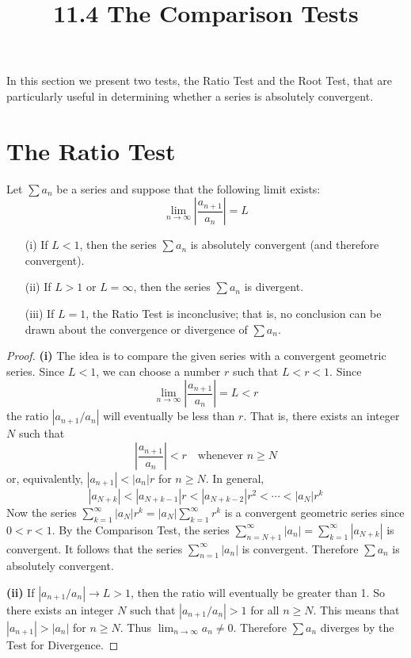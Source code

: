 \documentclass{article}
\title{11.4 The Comparison Tests}
\date{}
\author{}
\theoremstyle{mystyle}
\begin{document}
\maketitle

In this section we present two tests, the Ratio Test and the Root Test, that are particularly useful in determining whether a series is absolutely convergent.

\section*{The Ratio Test}

\begin{tcolorbox}[
    colback=white,
    colframe=orange!80!white,
    title=The Ratio Test,
    boxrule=0.5mm,
    arc=3mm
    ]
    Let \( \sum a_n \) be a series and suppose that the following limit exists:
    \[ \lim_{n\to\infty} \left| \dfrac{a_{n+1}}{a_n} \right| = L \]
    \begin{itemize}
        \item[(i)] If \(L < 1\), then the series \( \sum a_n \) is absolutely convergent (and therefore convergent).
        \item[(ii)] If \(L > 1\) or \(L = \infty\), then the series \( \sum a_n \) is divergent.
        \item[(iii)] If \(L = 1\), the Ratio Test is inconclusive; that is, no conclusion can be drawn about the convergence or divergence of \( \sum a_n \).
    \end{itemize}
\end{tcolorbox}

\begin{proof}
\textbf{(i)} The idea is to compare the given series with a convergent geometric series. Since \(L < 1\), we can choose a number \(r\) such that \(L < r < 1\). Since
\[ \lim_{n\to\infty} \left| \dfrac{a_{n+1}}{a_n} \right| = L < r \]
the ratio \( |a_{n+1}/a_n| \) will eventually be less than \(r\). That is, there exists an integer \(N\) such that
\[ \left| \dfrac{a_{n+1}}{a_n} \right| < r \quad \text{whenever } n \ge N \]
or, equivalently, \( |a_{n+1}| < |a_n|r \) for \(n \ge N\). In general,
\[ |a_{N+k}| < |a_{N+k-1}|r < |a_{N+k-2}|r^2 < \cdots < |a_N|r^k \]
Now the series \( \sum_{k=1}^{\infty} |a_N|r^k = |a_N| \sum_{k=1}^{\infty} r^k \) is a convergent geometric series since \(0 < r < 1\). By the Comparison Test, the series \( \sum_{n=N+1}^{\infty} |a_n| = \sum_{k=1}^{\infty} |a_{N+k}| \) is convergent. It follows that the series \( \sum_{n=1}^{\infty} |a_n| \) is convergent. Therefore \( \sum a_n \) is absolutely convergent.

\textbf{(ii)} If \( |a_{n+1}/a_n| \to L > 1 \), then the ratio will eventually be greater than 1. So there exists an integer \(N\) such that \( |a_{n+1}/a_n| > 1 \) for all \(n \ge N\). This means that \(|a_{n+1}| > |a_n|\) for \(n \ge N\). Thus \( \lim_{n\to\infty} a_n \neq 0 \). Therefore \( \sum a_n \) diverges by the Test for Divergence.
\end{proof}
\end{document}
